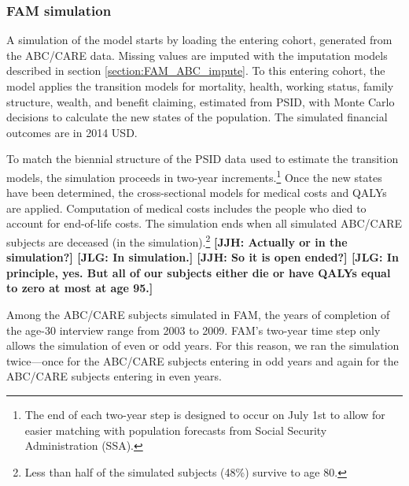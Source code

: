 


\subsubsection{FAM simulation}
\label{appendix:health-fam-simulation}

\noindent A simulation of the model starts by loading the entering cohort, generated from the ABC/CARE data. Missing values are imputed with the imputation models described in section \ref{section:FAM_ABC_impute}. To this entering cohort, the model applies the transition models for mortality, health, working status, family structure, wealth, and benefit claiming, estimated from PSID, with Monte Carlo decisions to calculate the new states of the population.
The simulated financial outcomes are in 2014 USD.


\noindent To match the biennial structure of the PSID data used to estimate the transition models, the simulation proceeds in two-year increments.\footnote{The end of each two-year step is designed to occur on July 1st to allow for easier matching with population forecasts from Social Security Administration (SSA).}
Once the new states have been determined, the cross-sectional models for medical costs and QALYs are applied.
Computation of medical costs includes the people who died to account for end-of-life costs.
The simulation ends when all simulated ABC/CARE subjects are deceased (in the simulation).\footnote{Less than half of the simulated subjects (48\%) survive to age 80.} \textbf{[JJH: Actually or in the simulation?] [JLG: In simulation.] [JJH: So it is open ended?] [JLG: In principle, yes. But all of our subjects either die or have QALYs equal to zero at most at age 95.]}

\noindent Among the ABC/CARE subjects simulated in FAM, the years of completion of the age-30 interview range from 2003 to 2009.
FAM's two-year time step only allows the simulation of even or odd years.
For this reason, we ran the simulation twice---once for the ABC/CARE subjects entering in odd years and again for the ABC/CARE subjects entering in even years.

